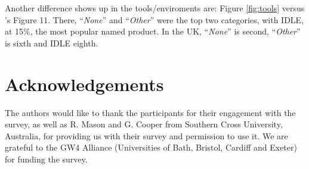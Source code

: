 \documentclass{sig-alternate}
\begin{document}
Another difference shows up in the tools/enviroments are: Figure
\ref{fig:tools} versus \cite{mason+cooper:2014}'s Figure 11. There,
``{\emph{None}}'' and ``{\emph{Other}}'' were the top two categories,
with IDLE, at 15\%, the most popular named product. In the UK,
``{\emph{None}}'' is second, ``{\emph{Other}}'' is sixth and IDLE
eighth.


\section{Acknowledgements}

The authors would like to thank the participants for their engagement
with the survey, as well as R. Mason and G. Cooper from Southern Cross
University, Australia, for providing us with their survey and
permission to use it.
We are grateful to the GW4 Alliance (Universities of Bath, Bristol,
Cardiff and Exeter) for funding the  survey.  %


\end{document}
